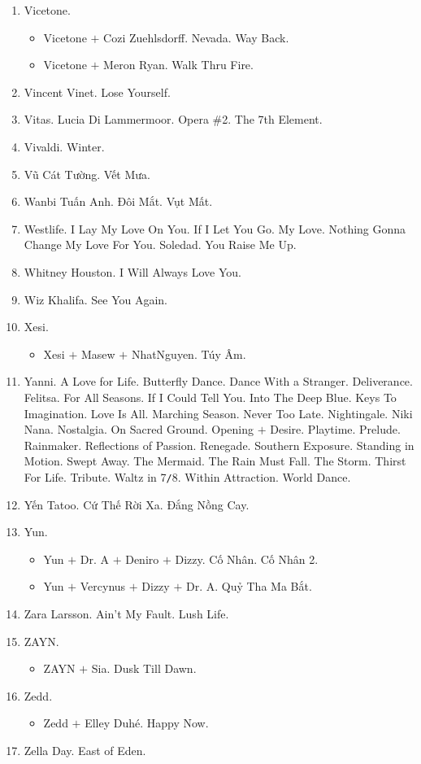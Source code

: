 \documentclass{article}
\begin{document}
\begin{enumerate}
	\item {\sc Vicetone.}
	\begin{itemize}
		\item {\sc Vicetone $+$ Cozi Zuehlsdorff.} Nevada. Way Back.
		\item {\sc Vicetone $+$ Meron Ryan.} Walk Thru Fire.
	\end{itemize}
	\item {\sc Vincent Vinet.} Lose Yourself.
	\item {\sc Vitas.} Lucia Di Lammermoor. Opera \#2. The 7th Element.
	\item {\sc Vivaldi.} Winter.
	\item {\sc Vũ Cát Tường.} Vết Mưa.
	\item {\sc Wanbi Tuấn Anh.} Đôi Mắt. Vụt Mất.
	\item {\sc Westlife.} I Lay My Love On You. If I Let You Go. My Love. Nothing Gonna Change My Love For You. Soledad. You Raise Me Up.
	\item {\sc Whitney Houston.} I Will Always Love You.
	\item {\sc Wiz Khalifa.} See You Again.
	\item {\sc Xesi.}
	\begin{itemize}
		\item {\sc Xesi $+$ Masew $+$ NhatNguyen.} Túy Âm.
	\end{itemize}
	\item {\sc Yanni.} A Love for Life. Butterfly Dance. Dance With a Stranger. Deliverance. Felitsa. For All Seasons. If I Could Tell You. Into The Deep Blue. Keys To Imagination. Love Is All. Marching Season. Never Too Late. Nightingale. Niki Nana. Nostalgia. On Sacred Ground. Opening $+$ Desire. Playtime. Prelude. Rainmaker. Reflections of Passion. Renegade. Southern Exposure. Standing in Motion. Swept Away. The Mermaid. The Rain Must Fall. The Storm. Thirst For Life. Tribute. Waltz in 7{\tt/}8. Within Attraction. World Dance.
	\item {\sc Yến Tatoo.} Cứ Thế Rời Xa. Đắng Nồng Cay.
	\item {\sc Yun.}
	\begin{itemize}
		\item {\sc Yun $+$ Dr. A $+$ Deniro $+$ Dizzy.} Cố Nhân. Cố Nhân 2.
		\item {\sc Yun $+$ Vercynus $+$ Dizzy $+$ Dr. A.} Quỷ Tha Ma Bắt.
	\end{itemize}
	\item {\sc Zara Larsson.} Ain't My Fault. Lush Life.
	\item {\sc ZAYN.}
	\begin{itemize}
		\item {\sc ZAYN $+$ Sia.} Dusk Till Dawn.
	\end{itemize}
	\item {\sc Zedd.}
	\begin{itemize}
		\item {\sc Zedd $+$ Elley Duh\'e.} Happy Now.
	\end{itemize}
	\item {\sc Zella Day.} East of Eden.
\end{enumerate}
\end{document}
